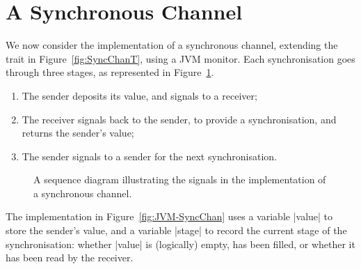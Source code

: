 \section{A Synchronous Channel}

We now consider the implementation of a synchronous channel, extending the
trait in Figure~\ref{fig:SyncChanT}, using a JVM monitor.  Each
synchronisation goes through three stages, as represented in
Figure~\ref{fig:JVM-syncChan-seqDiagram}.
%
\begin{enumerate}
\item The sender  deposits its value, and signals to a receiver;

\item The receiver signals back to the sender, to provide a
  synchronisation, and returns the sender's value; 

\item The sender signals to a sender for the next synchronisation.
\end{enumerate}


\begin{figure}
\begin{center}
\def\height{5.2}
\end{center}
\caption{A sequence diagram illustrating the signals in the implementation of
  a synchronous channel.}
\label{fig:JVM-syncChan-seqDiagram}
\end{figure}


The implementation in Figure~\ref{fig:JVM-SyncChan} uses a variable |value| to
store the sender's value, and a variable |stage| to record the current stage
of the synchronisation: whether |value| is (logically) empty, has been filled,
or whether it has been read by the receiver.

